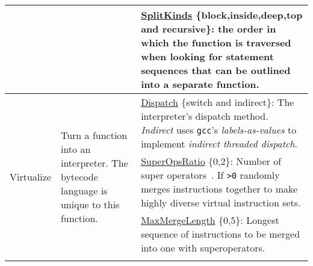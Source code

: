 \begin{table*}[!hp]
\begin{tabular}{|p{2.25cm}|p{4cm}|p{11cm}|}
                                     &                                                                                                                                                                                                                                                                                                         & \underline{SplitKinds} \{block,inside,deep,top and recursive\}: the order in which the function is traversed when looking for statement sequences that can be outlined into a separate function. \\ \hline

\multirow{5}{*}{Virtualize}          & \multirow{5}{4cm}{Turn a function into an interpreter. The bytecode language is unique to this function. 
}                                                                                                                                                                                                                                                  & \underline{Dispatch} \{switch and indirect\}: The interpreter's dispatch method. {\em Indirect} uses {\tt gcc}'s {\em labels-as-values} to implement {\em indirect threaded dispatch}.                                                                                                                                                                                                                                                                               \\ \cline{3-3} 
                                     &                                                                                                                                                                                                                                                                                                         & \underline{SuperOpsRatio} \{0,2\}: Number of super operators~\cite{proebsting96optimizing}. If {\tt >0} randomly merges  instructions together to make highly diverse virtual instruction sets.                                                                                                                                                                                                                                                                                                      \\ \cline{3-3} 
                                     &                                                                                                                                                                                                                                                                                                         & \underline{MaxMergeLength} \{0,5\}: Longest sequence of instructions to be merged into one with superoperators.                                                                                                                                                                                                                                                                        \\ \cline{3-3} 

\end{tabular}
\end{table*}
